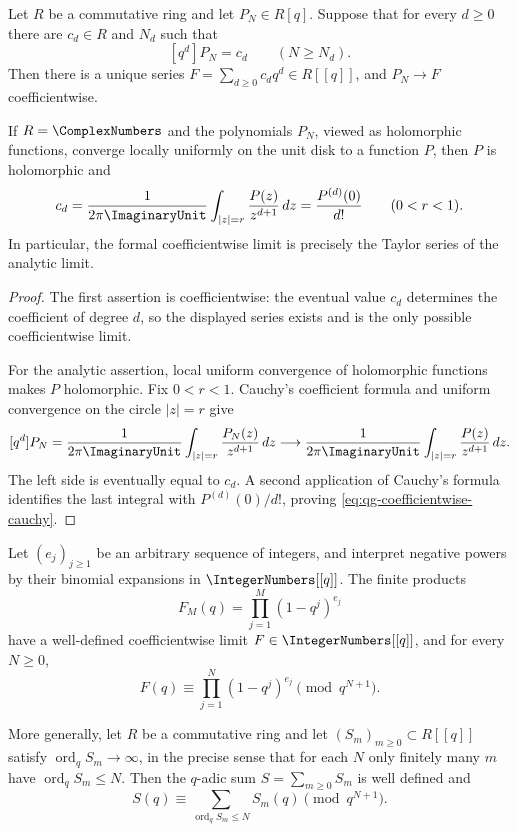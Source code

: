 \begin{proposition}
\label{qg:prop-coefficientwise-limit}
Let \(R\) be a commutative ring and let \(P_N\in R[q]\).  Suppose that for
every \(d\ge0\) there are \(c_d\in R\) and \(N_d\) such that
\[
 [q^d]P_N=c_d\qquad(N\ge N_d).
\]
Then there is a unique series \(F=\sum_{d\ge0}c_dq^d\in R[[q]]\), and
\(P_N\to F\) coefficientwise.

If \(R=\ComplexNumbers\) and the polynomials \(P_N\), viewed as holomorphic
functions, converge locally uniformly on the unit disk to a function \(P\),
then \(P\) is holomorphic and
\begin{equation}
 c_d=\frac{1}{2\pi\ImaginaryUnit}
     \int_{|z|=r}\frac{P(z)}{z^{d+1}}\,dz
     =\frac{P^{(d)}(0)}{d!}
 \qquad(0<r<1).
\label{eq:qg-coefficientwise-cauchy}
\end{equation}
In particular, the formal coefficientwise limit is precisely the Taylor
series of the analytic limit.
\end{proposition}

\begin{proof}
The first assertion is coefficientwise: the eventual value \(c_d\) determines
the coefficient of degree \(d\), so the displayed series exists and is the
only possible coefficientwise limit.

For the analytic assertion, local uniform convergence of holomorphic
functions makes \(P\) holomorphic.  Fix \(0<r<1\).  Cauchy's coefficient
formula and uniform convergence on the circle \(|z|=r\) give
\[
 [q^d]P_N
 =\frac{1}{2\pi\ImaginaryUnit}
   \int_{|z|=r}\frac{P_N(z)}{z^{d+1}}\,dz
 \longrightarrow
 \frac{1}{2\pi\ImaginaryUnit}
   \int_{|z|=r}\frac{P(z)}{z^{d+1}}\,dz.
\]
The left side is eventually equal to \(c_d\).  A second application of
Cauchy's formula identifies the last integral with \(P^{(d)}(0)/d!\), proving
\eqref{eq:qg-coefficientwise-cauchy}.
\end{proof}

\begin{proposition}
\label{qg:prop-truncation-principle}
Let \((e_j)_{j\ge1}\) be an arbitrary sequence of integers, and interpret
negative powers by their binomial expansions in \(\IntegerNumbers[[q]]\).
The finite products
\[
 F_M(q)=\prod_{j=1}^{M}(1-q^j)^{e_j}
\]
have a well-defined coefficientwise limit \(F\in\IntegerNumbers[[q]]\), and
for every \(N\ge0\),
\begin{equation}
 F(q)\equiv\prod_{j=1}^{N}(1-q^j)^{e_j}
 \pmod{q^{N+1}}.
\label{eq:qg-truncation-product}
\end{equation}

More generally, let \(R\) be a commutative ring and let
\((S_m)_{m\ge0}\subset R[[q]]\) satisfy
\(\operatorname{ord}_qS_m\to\infty\), in the precise sense that for each
\(N\) only finitely many \(m\) have
\(\operatorname{ord}_qS_m\le N\).  Then the \(q\)-adic sum
\(S=\sum_{m\ge0}S_m\) is well defined and
\begin{equation}
 S(q)\equiv
 \sum_{\operatorname{ord}_qS_m\le N}S_m(q)
 \pmod{q^{N+1}}.
\label{eq:qg-truncation-series}
\end{equation}
\end{proposition}

